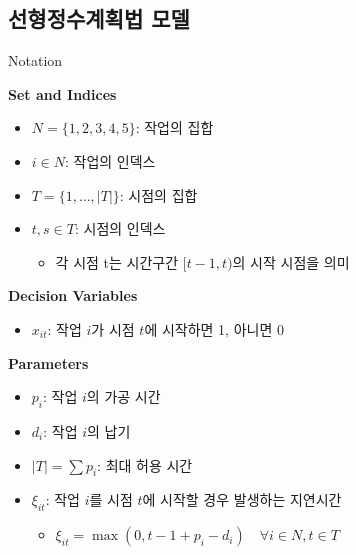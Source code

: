 \documentclass[10pt]{article}
\begin{document}
\subsection{선형정수계획법 모델}
\begin{stabilitybox}{Notation}
    \begin{minipage}[t]{0.51\linewidth}
        \textbf{Set and Indices}
        \begin{itemize}
            \item $N = \{1,2,3,4,5\}$: 작업의 집합
            \item $i \in N$: 작업의 인덱스
            \item $T = \{1, \dots, |T|\}$: 시점의 집합
            \item $t, s \in T$: 시점의 인덱스
            \begin{itemize}
                \item 각 시점 t는 시간구간 $[t-1, t)$의 시작 시점을 의미
            \end{itemize}
        \end{itemize}
    \end{minipage}
    \hfill
    \begin{minipage}[t]{0.48\linewidth}
        \textbf{Decision Variables}
        \begin{itemize}
            \item $x_{it}$: 작업 $i$가 시점 $t$에 시작하면 1, 아니면 0
        \end{itemize}
        \textbf{Parameters}
        \begin{itemize}
            \item $p_i$: 작업 $i$의 가공 시간
            \item $d_i$: 작업 $i$의 납기
            \item $|T| = \sum p_i$: 최대 허용 시간
            \item $\xi_{it}$: 작업 $i$를 시점 $t$에 시작할 경우 발생하는 지연시간
            \begin{itemize}
                \item $\xi_{it} = \max(0, t-1 + p_i - d_i) \quad \forall i \in N, t \in T$
            \end{itemize}
        \end{itemize}
    \end{minipage}
\end{stabilitybox}
\end{document}
